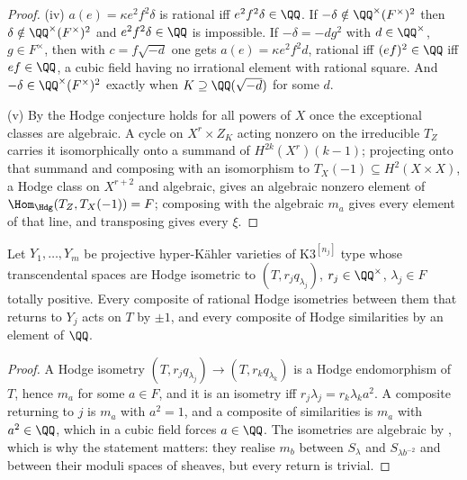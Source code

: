 \begin{proof}
(iv) $a(e)=\kappa e^{2}f^{2}\delta$ is rational iff $e^{2}f^{2}\delta\in\QQ$. If $-\delta\notin\QQ^{\times}(F^{\times})^{2}$ then $\delta\notin\QQ^{\times}(F^{\times})^{2}$ and $e^{2}f^{2}\delta\in\QQ$ is impossible. If $-\delta=-dg^{2}$ with $d\in\QQ^{\times}$, $g\in F^{\times}$, then with $c=f\sqrt{-d}$ one gets $a(e)=\kappa e^{2}f^{2}d$, rational iff $(ef)^{2}\in\QQ$ iff $ef\in\QQ$, a cubic field having no irrational element with rational square. And $-\delta\in\QQ^{\times}(F^{\times})^{2}$ exactly when $K\supseteq\QQ(\sqrt{-d})$ for some $d$.

(v) By \cite[Thm.~21.7]{BMB26} the Hodge conjecture holds for all powers of $X$ once the exceptional classes are algebraic. A cycle on $X^{r}\times Z_{K}$ acting nonzero on the irreducible $T_{Z}$ carries it isomorphically onto a summand of $H^{2k}(X^{r})(k-1)$; projecting onto that summand and composing with an isomorphism to $T_{X}(-1)\subseteq H^{2}(X\times X)$, a Hodge class on $X^{r+2}$ and algebraic, gives an algebraic nonzero element of $\Hom_{\Hdg}(T_{Z},T_{X}(-1))=F$; composing with the algebraic $m_{a}$ gives every element of that line, and transposing gives every $\xi$.
\end{proof}

\begin{proposition}\label{prop:hk}
Let $Y_{1},\dots,Y_{m}$ be projective hyper-K\"ahler varieties of K3$^{[n_{j}]}$ type whose transcendental spaces are Hodge isometric to $(T,r_{j}q_{\lambda_{j}})$, $r_{j}\in\QQ^{\times}$, $\lambda_{j}\in F$ totally positive. Every composite of rational Hodge isometries between them that returns to $Y_{j}$ acts on $T$ by $\pm1$, and every composite of Hodge similarities by an element of $\QQ$.
\end{proposition}

\begin{proof}
A Hodge isometry $(T,r_{j}q_{\lambda_{j}})\to(T,r_{k}q_{\lambda_{k}})$ is a Hodge endomorphism of $T$, hence $m_{a}$ for some $a\in F$, and it is an isometry iff $r_{j}\lambda_{j}=r_{k}\lambda_{k}a^{2}$. A composite returning to $j$ is $m_{a}$ with $a^{2}=1$, and a composite of similarities is $m_{a}$ with $a^{2}\in\QQ$, which in a cubic field forces $a\in\QQ$. The isometries are algebraic by \cite{Bus19,Mar24}, which is why the statement matters: they realise $m_{b}$ between $S_{\lambda}$ and $S_{\lambda b^{-2}}$ and between their moduli spaces of sheaves, but every return is trivial.
\end{proof}

